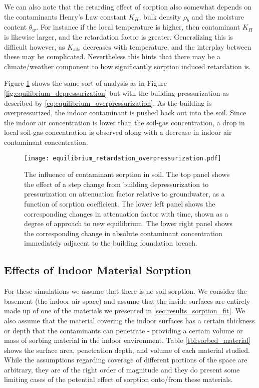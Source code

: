 We can also note that the retarding effect of sorption also somewhat depends on the contaminants Henry's Law constant $K_H$, bulk density $\rho_b$ and the moisture content $\theta_w$.
For instance if the local temperature is higher, then contaminant $K_H$ is likewise larger, and the retardation factor is greater.
Generalizing this is difficult however, as $K_\mathrm{ads}$ decreases with temperature, and the interplay between these may be complicated.
Nevertheless this hints that there may be a climate/weather component to how significantly sorption induced retardation is.\par

Figure \ref{fig:equilibrium_overpressurization} shows the same sort of analysis as in Figure \ref{fig:equilibrium_depressurization} but with the building pressurization as described by \eqref{eq:equilibrium_overpressurization}.
As the building is overpressurized, the indoor contaminant is pushed back out into the soil.
Since the indoor air concentration is lower than the soil-gas concentration, a drop in local soil-gas concentration is observed along with a decrease in indoor air contaminant concentration.\par

\begin{figure}[!htb]
  \texttt{[image: equilibrium\_retardation\_overpressurization.pdf]}
  \caption{The influence of contaminant sorption in soil. The top panel shows the effect of a step change from building depressurization to pressurization on attenuation factor relative to groundwater, as a function of sorption coefficient. The lower left panel shows the corresponding changes in attenuation factor with time, shown as a degree of approach to new equilibrium.  The lower right panel shows the corresponding change in absolute contaminant concentration immediately adjacent to the building foundation breach.}
  \label{fig:equilibrium_overpressurization}
\end{figure}

\subsection{Effects of Indoor Material Sorption}\label{sec:results_indoor_sorption}

For these simulations we assume that there is no soil sorption.
We consider the basement (the indoor air space) and assume that the inside surfaces are entirely made up of one of the materials we presented in \ref{sec:results_sorption_fit}.
We also assume that the material covering the indoor surfaces has a certain thickness or depth that the contaminants can penetrate - providing a certain volume or mass of sorbing material in the indoor environment.
Table \ref{tbl:sorbed_material} shows the surface area, penetration depth, and volume of each material studied.
While the assumptions regarding coverage of different portions of the space are arbitrary, they are of the right order of magnitude and they do present some limiting cases of the potential effect of sorption onto/from these materials.\par

